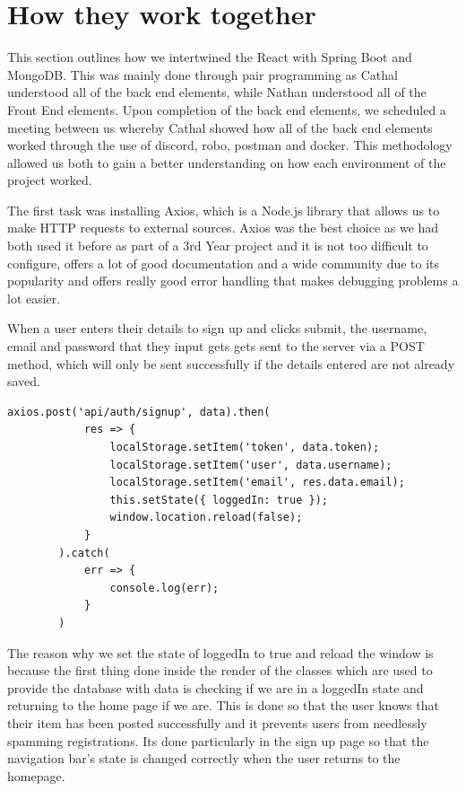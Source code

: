 \section{How they work together}
This section outlines how we intertwined the React with Spring Boot and MongoDB. This was mainly done through pair programming as Cathal understood all of the back end elements, while Nathan understood all of the Front End elements. Upon completion of the back end elements, we scheduled a meeting between us whereby Cathal showed how all of the back end elements worked through the use of discord, robo, postman and docker. This methodology allowed us both to gain a better understanding on how each environment of the project worked. \par
The first task was installing Axios, which is a Node.js library that allows us to make HTTP requests to external sources. Axios was the best choice as we had both used it before as part of a 3rd Year project and it is not too difficult to configure, offers a lot of good documentation and a wide community due to its popularity and offers really good error handling that makes debugging problems a lot easier. \par
When a user enters their details to sign up and clicks submit, the username, email and password that they input gets gets sent to the server via a POST method, which will only be sent successfully if the details entered are not already saved.
\par
\begin{verbatim}
axios.post('api/auth/signup', data).then(
            res => {
                localStorage.setItem('token', data.token);
                localStorage.setItem('user', data.username);
                localStorage.setItem('email', res.data.email);
                this.setState({ loggedIn: true });
                window.location.reload(false);
            }
        ).catch(
            err => {
                console.log(err);
            }
        )
\end{verbatim}
The reason why we set the state of loggedIn to true and reload the window is because the first thing done inside the render of the classes which are used to provide the database with data is checking if we are in a loggedIn state and returning to the home page if we are. This is done so that the user knows that their item has been posted successfully and it prevents users from needlessly spamming registrations. Its done particularly in the sign up page so that the navigation bar's state is changed correctly when the user returns to the homepage. \par
